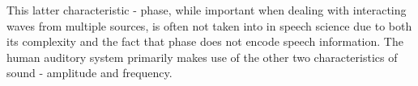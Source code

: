 \DIFdelbegin %
{%
}
{%
}
{%
}
{%
}

\DIFdelend This latter characteristic - phase, while important when dealing with interacting waves from multiple sources, is often not taken into \DIFaddbegin {}\DIFaddend in speech science due to both its complexity and the fact that phase does not encode \DIFdelbegin {}\DIFdelend \DIFaddbegin {}\DIFaddend speech information.  The human auditory system primarily makes use of the other two characteristics of sound - amplitude and frequency.

